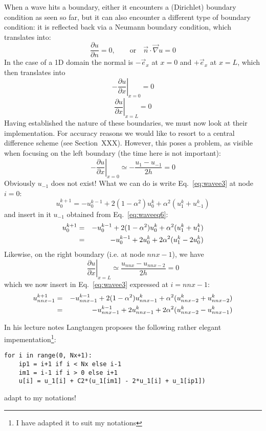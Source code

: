 When a wave hits a boundary, either it encounters a (Dirichlet)
boundary condition as seen so far, but it can also encounter
a different type of boundary condition: it is reflected back 
via a Neumann boundary condition, which translates into:
\[
\frac{\partial u}{\partial n} = 0, \qquad \text{or} \quad
\vec{n} \cdot \vec\nabla u = 0
\]
In the case of a 1D domain the normal is $-\vec{e}_x$ at $x=0$
and $+\vec{e}_x$ at $x=L$, which then translates into
\[
\left. -\frac{\partial u}{\partial x} \right|_{x=0} = 0
\]
\[
\left. \frac{\partial u}{\partial x} \right|_{x=L} = 0
\]
Having established the nature of these boundaries, 
we must now look at their implementation.
For accuracy reasons we would like to resort to a central 
difference scheme (see Section~XXX).
However, this poses a problem, as visible when focusing on the 
left boundary (the time here is not important):
\begin{equation}
\left. -\frac{\partial u}{\partial x} \right|_{x=0} \simeq - \frac{u_1-u_{-1}}{2 h} =0
\label{eq:waveeq6}
\end{equation}
Obviously $u_{-1}$ does not exist! 
What we can do is write Eq.~\eqref{eq:wavee3} at node $i=0$:
\[
u_0^{k+1} = - u_0^{k-1} +2(1-\alpha^2) u_{0}^k + \alpha^2 (u_{1}^k +u_{-1}^k ) 
\]
and insert in it $u_{-1}$ obtained from Eq.~\eqref{eq:waveeq6}:
\begin{eqnarray}
u_0^{k+1} 
&=& - u_0^{k-1} +2(1-\alpha^2) u_{0}^k + \alpha^2 (u_{1}^k +u_{1}^k )  \nonumber\\
&=& - u_0^{k-1} +2 u_{0}^k + 2\alpha^2 (u_{1}^k -2u_0^k )  
\label{eq:waveeq7}
\end{eqnarray}
Likewise, on the right boundary (i.e. at node $nnx-1$), we have
\[
\left. \frac{\partial u}{\partial x} \right|_{x=L} \simeq \frac{u_{nnx}-u_{nnx-2}}{2h}  = 0
\]
which we now insert in Eq.~\eqref{eq:wavee3} expressed at $i=nnx-1$:
\begin{eqnarray}
u_{nnx-1}^{k+1} 
&=& - u_{nnx-1}^{k-1} +2(1-\alpha^2) u_{nnx-1}^k + \alpha^2 (u_{nnx-2}^k +u_{nnx-2}^k ) \nonumber\\
&=& - u_{nnx-1}^{k-1} +2 u_{nnx-1}^k + 2\alpha^2 (u_{nnx-2}^k-u_{nnx-1}^k  )
\label{eq:waveeq8}
\end{eqnarray}

In his lecture notes Langtangen proposes the following rather elegant 
impementation\footnote{I have adapted it to suit my notations}:
\begin{lstlisting}
for i in range(0, Nx+1):
    ip1 = i+1 if i < Nx else i-1
    im1 = i-1 if i > 0 else i+1
    u[i] = u_1[i] + C2*(u_1[im1] - 2*u_1[i] + u_1[ip1])
\end{lstlisting}
{\color{red} adapt to my notations!}


